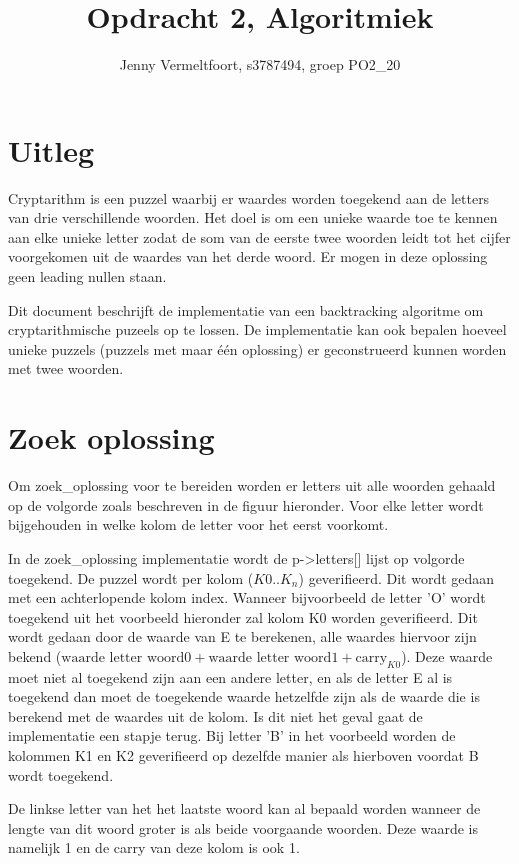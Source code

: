 \documentclass[twocolumn,10pt]{article}
\title{Opdracht 2, Algoritmiek}
\author{Jenny Vermeltfoort, s3787494, groep PO2\_20}
\begin{document}
\def\tablename{Tabel}

\maketitle

\section*{Uitleg}
Cryptarithm is een puzzel waarbij er waardes worden toegekend aan de letters van drie verschillende woorden. Het doel is om een unieke waarde toe te kennen aan elke unieke letter zodat de som van de eerste twee woorden leidt tot het cijfer voorgekomen uit de waardes van het derde woord. Er mogen in deze oplossing geen leading nullen staan. 

Dit document beschrijft de implementatie van een backtracking algoritme om cryptarithmische puzeels op te lossen. De implementatie kan ook bepalen hoeveel unieke puzzels (puzzels met maar 
\'e\'en oplossing) er geconstrueerd kunnen worden met twee woorden.


\section*{Zoek oplossing}
Om zoek\_oplossing voor te bereiden worden er letters uit alle woorden gehaald op de volgorde zoals beschreven in de figuur hieronder. Voor elke letter wordt bijgehouden in welke kolom de letter voor het eerst voorkomt. 

In de zoek\_oplossing implementatie wordt de p->letters[] lijst op volgorde toegekend. De puzzel wordt per kolom ($K0.. K_n$) geverifieerd. Dit wordt gedaan met een achterlopende kolom index. Wanneer bijvoorbeeld de letter 'O' wordt toegekend uit het voorbeeld hieronder zal kolom K0 worden geverifieerd. Dit wordt gedaan door de waarde van E te berekenen, alle waardes hiervoor zijn bekend ($\text{waarde letter woord0} + \text{waarde letter woord1} + \text{carry}_{K0}$). Deze waarde moet niet al toegekend zijn aan een andere letter, en als de letter E al is toegekend dan moet de toegekende waarde hetzelfde zijn als de waarde die is berekend met de waardes uit de kolom. Is dit niet het geval gaat de implementatie een stapje terug. Bij letter 'B' in het voorbeeld worden de kolommen K1 en K2 geverifieerd op dezelfde manier als hierboven voordat B wordt toegekend.

De linkse letter van het het laatste woord kan al bepaald worden wanneer de lengte van dit woord groter is als beide voorgaande woorden. Deze waarde is namelijk 1 en de carry van deze kolom is ook 1.
\end{document}
